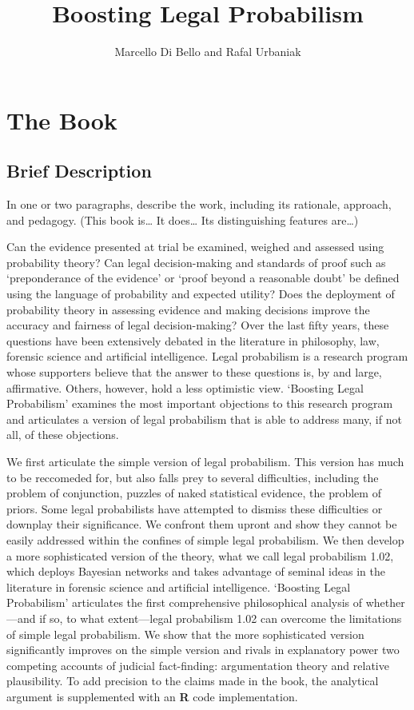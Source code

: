 \documentclass[10pt,dvipsnames,enabledeprecatedfontcommands]{scrartcl}
\title{Boosting Legal Probabilism}
\author{Marcello Di Bello and Rafal Urbaniak}
\date{}
\begin{document}
\maketitle

\hypertarget{the-book}{%
\section{The Book}\label{the-book}}

\hypertarget{brief-description}{%
\subsection{Brief Description}\label{brief-description}}

\footnotesize In one or two paragraphs, describe the work, including its
rationale, approach, and pedagogy. (This book is\ldots{} It does\ldots{}
Its distinguishing features are\ldots{})

\normalsize

Can the evidence presented at trial be examined, weighed and assessed
using probability theory? Can legal decision-making and standards of
proof such as `preponderance of the evidence' or `proof beyond a
reasonable doubt' be defined using the language of probability and
expected utility? Does the deployment of probability theory in assessing
evidence and making decisions improve the accuracy and fairness of legal
decision-making? Over the last fifty years, these questions have been
extensively debated in the literature in philosophy, law, forensic
science and artificial intelligence. Legal probabilism is a research
program whose supporters believe that the answer to these questions is,
by and large, affirmative. Others, however, hold a less optimistic view.
`Boosting Legal Probabilism' examines the most important objections to
this research program and articulates a version of legal probabilism
that is able to address many, if not all, of these objections.

We first articulate the simple version of legal probabilism. This
version has much to be reccomeded for, but also falls prey to several
difficulties, including the problem of conjunction, puzzles of naked
statistical evidence, the problem of priors. Some legal probabilists
have attempted to dismiss these difficulties or downplay their
significance. We confront them upront and show they cannot be easily
addressed within the confines of simple legal probabilism. We then
develop a more sophisticated version of the theory, what we call legal
probabilism 1.02, which deploys Bayesian networks and takes advantage of
seminal ideas in the literature in forensic science and artificial
intelligence. `Boosting Legal Probabilism' articulates the first
comprehensive philosophical analysis of whether---and if so, to what
extent---legal probabilism 1.02 can overcome the limitations of simple
legal probabilism. We show that the more sophisticated version
significantly improves on the simple version and rivals in explanatory
power two competing accounts of judicial fact-finding: argumentation
theory and relative plausibility. To add precision to the claims made in
the book, the analytical argument is supplemented with an
\textbf{\textsf{R}} code implementation.
\end{document}
